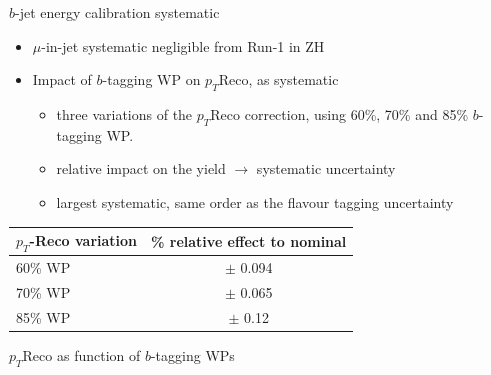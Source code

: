 \begin{frame}{$b$-jet energy calibration systematic}
    \begin{itemize}
        \item $\mu$-in-jet systematic negligible from Run-1 in ZH
        \item Impact of $b$-tagging WP on $p_T$Reco, as systematic
        \begin{itemize}
            \item three variations of the $p_T$Reco correction, using 60\%, 70\% and 85\% $b$-tagging WP.
            \item relative impact on the yield $\to$ systematic uncertainty
            \item largest systematic, same order as the flavour tagging uncertainty
        \end{itemize}
    \end{itemize}
    \begin{table}[]
        \centering
        \begin{tabular}{lc}
        \hline\hline
            $p_T$-Reco variation & \% relative effect to nominal \\
        \hline    
            60\% WP & $\pm$ 0.094 \\
            70\% WP & $\pm$ 0.065 \\
            85\% WP & $\pm$ 0.12 \\
        \hline\hline
        \end{tabular}
    \end{table}
    
\end{frame}
\begin{frame}{$p_T$Reco as function of $b$-tagging WPs}
    \begin{figure}
        \centering
    \end{figure}
\end{frame}

